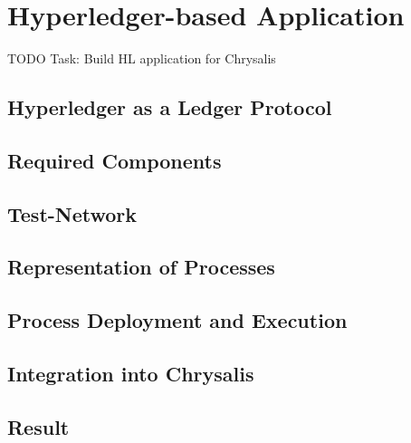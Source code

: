 %
\section{Hyperledger-based Application}
\label{sec:impr:hl}

TODO Task: Build HL application for Chrysalis

\subsection{Hyperledger as a Ledger Protocol}
\label{sec:impr:hl:basics}

\subsection{Required Components}
\label{sec:impr:hl:requirements}

\subsection{Test-Network}
\label{sec:impr:hl:network}

\subsection{Representation of Processes}
\label{sec:impr:hl:datastructure}

\subsection{Process Deployment and Execution}
\label{sec:impr:hl:chaincode}

\subsection{Integration into Chrysalis}
\label{sec:impr:hl:integration}

\subsection{Result}
\label{sec:impr:hl:result}

